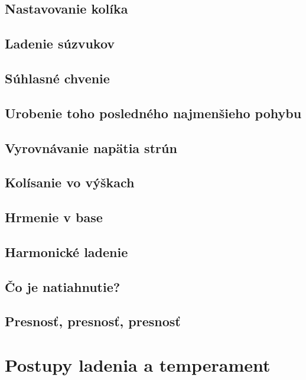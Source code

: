 \subsection{Nastavovanie kolíka}

\subsection{Ladenie súzvukov}

\subsection{Súhlasné chvenie}

\subsection{Urobenie toho posledného najmenšieho pohybu}

\subsection{Vyrovnávanie napätia strún}

\subsection{Kolísanie vo výškach}

\subsection{Hrmenie v base}

\subsection{Harmonické ladenie}

\subsection{Čo je natiahnutie?}

\subsection{Presnosť, presnosť, presnosť}

\section{Postupy ladenia a temperament}

